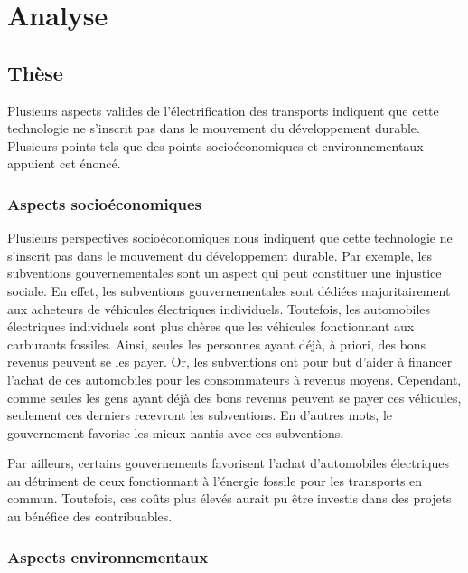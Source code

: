 
\chapter{Analyse}

\section{Thèse}

Plusieurs aspects valides de l'électrification des transports indiquent que cette technologie ne s'inscrit pas dans le mouvement du développement durable.
Plusieurs points tels que des points socioéconomiques et environnementaux appuient cet énoncé.

\subsection{Aspects socioéconomiques}

Plusieurs perspectives socioéconomiques nous indiquent que cette technologie ne s'inscrit pas dans le mouvement du développement durable. Par exemple, les subventions gouvernementales sont un aspect qui peut constituer une injustice sociale. En effet, les subventions gouvernementales sont dédiées majoritairement aux acheteurs de véhicules électriques individuels. Toutefois, les automobiles électriques individuels sont plus chères que les véhicules fonctionnant aux carburants fossiles. Ainsi, seules les personnes ayant déjà, à priori, des bons revenus peuvent se les payer. Or, les subventions ont pour but d'aider à financer l'achat de ces automobiles pour les consommateurs à revenus moyens. Cependant, comme seules les gens ayant déjà des bons revenus peuvent se payer ces véhicules, seulement ces derniers recevront les subventions. En d'autres mots, le gouvernement favorise les mieux nantis avec ces subventions.

Par ailleurs, certains gouvernements favorisent l'achat d'automobiles électriques au détriment de ceux fonctionnant à l'énergie fossile pour les transports en commun. Toutefois, ces coûts plus élevés aurait pu être investis dans des projets au bénéfice des contribuables.

\subsection{Aspects environnementaux}

